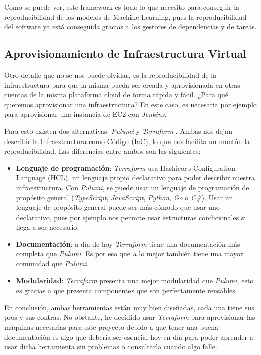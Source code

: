 Como se puede ver, este framework es todo lo que necesito para conseguir la reproducibilidad de los modelos de Machine Learning, pues la reproducibilidad del software ya está conseguida gracias a los gestores de dependencias y de tareas.

\subsection{Aprovisionamiento de Infraestructura Virtual}

Otro detalle que no se nos puede olvidar, es la reproducibilidad de la infraestructura para que la misma pueda ser creada y aprovisionada en otras cuentas de la misma plataforma cloud de forma rápida y fácil. ¿Para qué queremos aprovisionar una infraestructura? En este caso, es necesaria por ejemplo para aprovisionar una instancia de EC2 con \textit{Jenkins}.\newline

Para esto existen dos alternativas: \textit{Pulumi} \cite{pulumi} y \textit{Terraform} \cite{Terraform}. Ambas nos dejan describir la Infraestructura como Código (IaC), lo que nos facilita un montón la reproducibilidad. Las diferencias entre ambos son las siguientes:

\begin{itemize}
	\item \textbf{Lenguaje de programación}: \textit{Terraform} usa Hashicorp Configuration Language (HCL), un lenguaje propio declarativo para poder describir nuestra infraestructura. Con \textit{Pulumi}, se puede usar un lenguaje de programación de propósito general (\textit{TypeScript}, \textit{JavaScript}, \textit{Python}, \textit{Go} o \textit{C\#}). Usar un lenguaje de propósito general puede ser más cómodo que usar uno declarativo, pues por ejemplo nos permite usar estructuras condicionales si llega a ser necesario.
	\item \textbf{Documentación}: a día de hoy \textit{Terraform} tiene una documentación más completa que \textit{Pulumi}. Es por eso que a lo mejor también tiene una mayor comunidad que \textit{Pulumi}.
	\item \textbf{Modularidad}: \textit{Terraform} presenta una mejor modularidad que \textit{Pulumi}, esto es gracias a que presenta componentes que son perfectamente reusables.
\end{itemize}

En conclusión, ambas herramientas están muy bien diseñadas, cada una tiene sus pros y sus contras. No obstante, he decidido usar \textit{Terraform} para aprovisionar las máquinas necesarias para este proyecto debido a que tener una buena documentación es algo que debería ser esencial hoy en día para poder aprender a usar dicha herramienta sin problemas o consultarla cuando algo falle.

